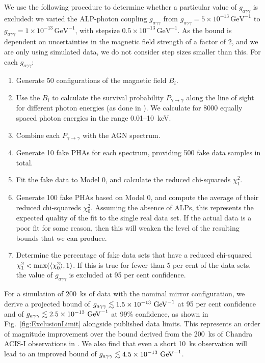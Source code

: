 \documentclass[fleqn,usenatbib,useAMS]{mnras}
\begin{document}
We use the following procedure to determine whether a particular value of $g_{a \gamma \gamma}$ is excluded: we varied the ALP-photon coupling $g_{a \gamma \gamma}$ from $g_{a \gamma \gamma} = 5 \times 10^{-13} \, \text{GeV}^{-1}$ to $g_{a \gamma \gamma} = 1\times 10^{-13} \, \text{GeV}^{-1}$, with stepsize $0.5 \times 10^{-13} \, \text{GeV}^{-1}$. As the bound is dependent on uncertainties in the magnetic field strength of a factor of 2, and we are only using simulated data, we do not consider step sizes smaller than this. For each $g_{a \gamma \gamma}$:
\begin{enumerate}
\item Generate 50 configurations of the magnetic field $B_i$.
\item Use the $B_i$ to calculate the survival probability $P_{\gamma \rightarrow \gamma}$ along the line of sight for different photon energies (as done in \citep{1312.3947}). We calculate for 8000 equally spaced photon energies in the range 0.01--10~keV.
\item Combine each $P_{\gamma \rightarrow \gamma}$ with the AGN spectrum.
\item Generate 10 fake PHAs for each spectrum, providing 500 fake data samples in total.
\item Fit the fake data to Model 0, and calculate the reduced chi-squareds $\chi_1^2$.
\item Generate 100 fake PHAs based on Model 0, and compute the average of their reduced chi-squareds $\chi_0^2$.
Assuming the absence of ALPs, this represents the expected quality of the fit to the single real data set. If the actual data is a poor fit
for some reason, then this will weaken the level of the resulting bounds that we can produce.
\item Determine the percentage of fake data sets that have a reduced chi-squared $\chi_1^2 < \rm{max}(\langle \chi_0^2 \rangle,1)$. If this is true for fewer than 5 per cent of the data sets, the value of $g_{a \gamma \gamma}$ is excluded at 95 per cent confidence.
\end{enumerate}

For a simulation of 200~ks of data with the nominal mirror configuration, we derive a projected
bound of ${g_{a\gamma\gamma} \lesssim 1.5 \times 10^{-13}~ \rm{GeV}^{-1}}$ at 95 per cent confidence and of ${g_{a\gamma\gamma} \lesssim 2.5 \times 10^{-13}~ \rm{GeV}^{-1}}$ at 99\% confidence, as shown in Fig.~\ref{fig:ExclusionLimit} alongside published data limits. This represents an order of magnitude improvement over the bound derived from the 200~ks of Chandra ACIS-I observations in \citep{Berg:2016ese}. We also find that even
a short 10~ks observation will lead to an improved bound of ${g_{a\gamma\gamma} \lesssim 4.5 \times 10^{-13}~ \rm{GeV}^{-1}}$.
\end{document}
